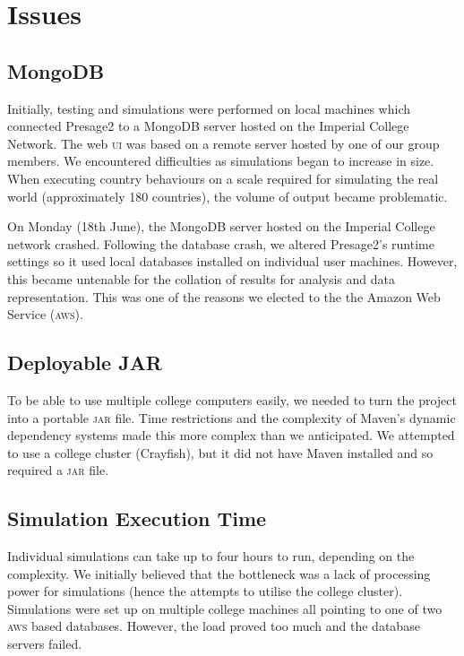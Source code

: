 \section{Issues}

%
%

\subsection{MongoDB}

Initially, testing and simulations were performed on local machines which connected Presage2 to a MongoDB server hosted on the Imperial College Network. The web \textsc{ui} was based on a remote server hosted by one of our group members. We encountered difficulties as simulations began to increase in size. When executing country behaviours on a scale required for simulating the real world (approximately 180 countries), the volume of output became problematic.

On Monday (18th June), the MongoDB server hosted on the Imperial College network crashed. Following the database crash, we altered Presage2's runtime settings so it used local databases installed on individual user machines. However, this became untenable for the collation of results for analysis and data representation. This was one of the reasons we elected to the the Amazon Web Service (\textsc{aws}).

\subsection{Deployable JAR}

To be able to use multiple college computers easily, we needed to turn the project into a portable \textsc{jar} file. Time restrictions and the complexity of Maven's dynamic dependency systems made this more complex than we anticipated.  We attempted to use a college cluster (Crayfish), but it did not have Maven installed and so required a \textsc{jar} file.

\subsection{Simulation Execution Time}

Individual simulations can take up to four hours to run, depending on the complexity. We initially believed that the bottleneck was a lack of processing power for simulations (hence the attempts to utilise the college cluster).  Simulations were set up on multiple college machines all pointing to one of two \textsc{aws} based databases.  However, the load proved too much and the database servers failed.

